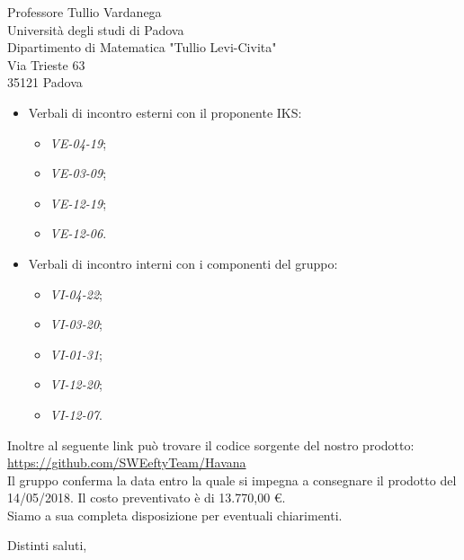 \documentclass[12pt]{letter} %
\begin{document}
\begin{letter}{Professore Tullio Vardanega \\ Università degli studi di Padova \\ Dipartimento di Matematica "Tullio Levi-Civita" \\ Via Trieste 63 \\ 35121 Padova}
\begin{addmargin}[2em]{2em}
\begin{itemize}
      \item Verbali di incontro esterni con il proponente IKS: \begin{itemize}
      	\item \emph{VE-04-19};
      	\item \emph{VE-03-09};
      	\item \emph{VE-12-19};
      	\item \emph{VE-12-06}.
      \end{itemize}
      \item Verbali di incontro interni con i componenti del gruppo:
      \begin{itemize}
      	\item \emph{VI-04-22};
      	\item \emph{VI-03-20};
      	\item \emph{VI-01-31};
      	\item \emph{VI-12-20};
      	\item \emph{VI-12-07}.
      \end{itemize}
      \end{itemize}
	Inoltre al seguente link può trovare il codice sorgente del nostro prodotto: \\
	\href{https://github.com/SWEeftyTeam/Havana}{https://github.com/SWEeftyTeam/Havana}\\ 
  Il gruppo conferma la data entro la quale si impegna a consegnare il prodotto del 14/05/2018. Il costo preventivato è di 13.770,00 \euro. \\ Siamo a sua completa disposizione per eventuali chiarimenti.
\end{addmargin}

\closing{Distinti saluti,}




\end{letter}
 
\end{document}

